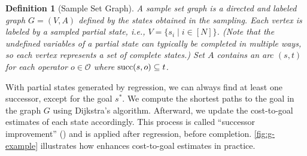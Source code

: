 \documentclass[ppgc,diss,english]{iiufrgs}
\newtheorem{definition}{Definition}
\begin{document}
\begin{definition}[Sample Set Graph]\label{def:graph}
A sample set graph is a directed and labeled graph $G=(V,A)$ defined by the states obtained in the sampling. Each vertex is labeled by a sampled partial state, i.e., $V = \{s_i \mid i \in [N]\}$. (Note that the undefined variables of a partial state can typically be completed in multiple ways, so each vertex represents a set of complete states.) Set $A$ contains an arc $(s,t)$ for each operator $o \in \mathcal{O}$ where $\operatorname{succ}(s,o) \subseteq t$.
\end{definition}

With partial states generated by regression, we can always find at least one successor, except for the goal $s^{*}$. We compute the shortest paths to the goal in the graph $G$ using Dijkstra's algorithm. Afterward, we update the cost-to-goal estimates of each state accordingly. This process is called ``successor improvement'' (\sui) and is applied after regression, before completion. \cref{fig:g-example} illustrates how \sui enhances cost-to-goal estimates in practice.
\end{document}

